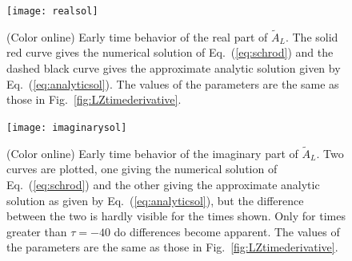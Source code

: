 \documentclass[twocolumn,english,pra,aps,superscriptaddress,floatfix]{revtex4-1}
\begin{document}
\begin{figure}
\texttt{[image: realsol]}
\caption{(Color online) Early time behavior of the real part of $\tilde{A}_{L}$. The solid red curve gives the numerical solution of Eq.\ (\ref{eq:schrod}) and the dashed black curve gives the approximate analytic solution given by Eq.\ (\ref{eq:analyticsol}). The values of the parameters are the same as those in Fig.\ \ref{fig:LZtimederivative}.}
\label{fig:realsol}
\end{figure}

\begin{figure}
\texttt{[image: imaginarysol]}
\caption{(Color online) Early time behavior of the imaginary part of $\tilde{A}_{L}$. Two curves are plotted, one giving the numerical solution of Eq.\ (\ref{eq:schrod}) and the other giving the approximate analytic solution as given by Eq.\ (\ref{eq:analyticsol}), but the difference between the two is hardly visible for the times shown. Only for times greater than $\tau=-40$ do differences become apparent.  The values of the parameters are the same as those in Fig.\ \ref{fig:LZtimederivative}.}
\label{fig:imagsol}
\end{figure}
\end{document}
